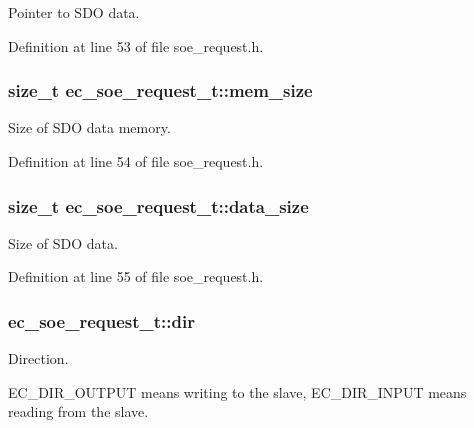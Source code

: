\-Pointer to \-S\-D\-O data. 



\-Definition at line 53 of file soe\-\_\-request.\-h.

\subsubsection[{mem\-\_\-size}]{\setlength{\rightskip}{0pt plus 5cm}size\-\_\-t {\bf ec\-\_\-soe\-\_\-request\-\_\-t\-::mem\-\_\-size}}\label{structec__soe__request__t_af259cf93b71c67824d7ca728b27a5776}


\-Size of \-S\-D\-O data memory. 



\-Definition at line 54 of file soe\-\_\-request.\-h.

\subsubsection[{data\-\_\-size}]{\setlength{\rightskip}{0pt plus 5cm}size\-\_\-t {\bf ec\-\_\-soe\-\_\-request\-\_\-t\-::data\-\_\-size}}\label{structec__soe__request__t_afb47843a1a15d493b35615bc5a65ca18}


\-Size of \-S\-D\-O data. 



\-Definition at line 55 of file soe\-\_\-request.\-h.

\subsubsection[{dir}]{ {\bf ec\-\_\-soe\-\_\-request\-\_\-t\-::dir}}\label{structec__soe__request__t_ad9788973a47b9b82bac17e527eb6d7a6}


\-Direction. 

\-E\-C\-\_\-\-D\-I\-R\-\_\-\-O\-U\-T\-P\-U\-T means writing to the slave, \-E\-C\-\_\-\-D\-I\-R\-\_\-\-I\-N\-P\-U\-T means reading from the slave. 

